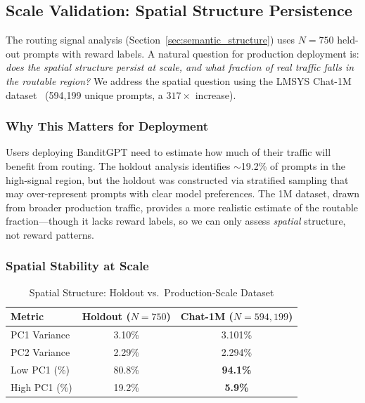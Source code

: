 
\subsection{Scale Validation: Spatial Structure Persistence}
\label{sec:scale_validation}

The routing signal analysis (Section~\ref{sec:semantic_structure}) uses $N=750$ held-out prompts with reward labels.
A natural question for production deployment is: \emph{does the spatial structure persist at scale, and what fraction of real traffic falls in the routable region?}
We address the spatial question using the LMSYS Chat-1M dataset~\cite{zheng2023lmsys} (594,199 unique prompts, a $317\times$ increase).

\subsubsection{Why This Matters for Deployment}

Users deploying BanditGPT need to estimate how much of their traffic will benefit from routing.
The holdout analysis identifies $\sim$19.2\% of prompts in the high-signal region, but the holdout was constructed via stratified sampling that may over-represent prompts with clear model preferences.
The 1M dataset, drawn from broader production traffic, provides a more realistic estimate of the routable fraction---though it lacks reward labels, so we can only assess \emph{spatial} structure, not reward patterns.

\subsubsection{Spatial Stability at Scale}

\begin{table}[t]
\centering
\caption{Spatial Structure: Holdout vs.\ Production-Scale Dataset}
\label{tab:scale_comparison}
\begin{tabular}{lcc}
\toprule
\textbf{Metric} & \textbf{Holdout ($N{=}750$)} & \textbf{Chat-1M ($N{=}594{,}199$)} \\
\midrule
PC1 Variance & 3.10\% & 3.101\% \\
PC2 Variance & 2.29\% & 2.294\% \\
\midrule
Low PC1 (\%) & 80.8\% & \textbf{94.1\%} \\
High PC1 (\%) & 19.2\% & \textbf{5.9\%} \\
\bottomrule
\end{tabular}
\end{table}

